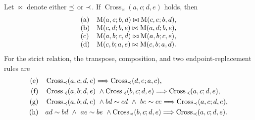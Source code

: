 \begin{theorem}
  \label{thm:cross-calculus}
  \leanok
  Let \(\mathrel{\bowtie}\) denote either \(\preceq\) or \(\prec\).  If
  \(\operatorname{Cross}_{\bowtie}(a,c;d,e)\) holds, then
  \[
    \begin{array}{ll}
      \text{(a)}&
        \operatorname{M}(a,e;b,d)\mathrel{\bowtie}\operatorname{M}(c,e;b,d),\\
      \text{(b)}&
        \operatorname{M}(c,d;b,e)\mathrel{\bowtie}\operatorname{M}(a,d;b,e),\\
      \text{(c)}&
        \operatorname{M}(a,b;c,d)\mathrel{\bowtie}\operatorname{M}(a,b;c,e),\\
      \text{(d)}&
        \operatorname{M}(c,b;a,e)\mathrel{\bowtie}\operatorname{M}(c,b;a,d).
    \end{array}
  \]
  For the strict relation, the transpose, composition, and two endpoint-replacement rules are
  \[
    \begin{aligned}
      \text{(e)}\quad&
      \operatorname{Cross}_{\prec}(a,c;d,e)
        \Longrightarrow \operatorname{Cross}_{\prec}(d,e;a,c),\\
      \text{(f)}\quad&
      \operatorname{Cross}_{\prec}(a,b;d,e)\ \wedge
      \operatorname{Cross}_{\prec}(b,c;d,e)
        \Longrightarrow \operatorname{Cross}_{\prec}(a,c;d,e),\\
      \text{(g)}\quad&
      \operatorname{Cross}_{\prec}(a,b;d,e)\ \wedge
      bd\sim cd\ \wedge\ be\sim ce
        \Longrightarrow \operatorname{Cross}_{\prec}(a,c;d,e),\\
      \text{(h)}\quad&
      ad\sim bd\ \wedge\ ae\sim be\ \wedge
      \operatorname{Cross}_{\prec}(b,c;d,e)
        \Longrightarrow \operatorname{Cross}_{\prec}(a,c;d,e).
    \end{aligned}
  \]
\end{theorem}

